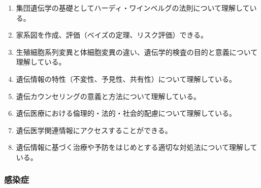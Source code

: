 \begin{enumerate}
\def\labelenumi{\arabic{enumi}.}
\tightlist
\item
  集団遺伝学の基礎としてハーディ・ワインベルグの法則について理解している。
\item
  家系図を作成、評価（ベイズの定理、リスク評価）できる。
\item
  生殖細胞系列変異と体細胞変異の違い、遺伝学的検査の目的と意義について理解している。
\item
  遺伝情報の特性（不変性、予見性、共有性）について理解している。
\item
  遺伝カウンセリングの意義と方法について理解している。
\item
  遺伝医療における倫理的・法的・社会的配慮について理解している。
\item
  遺伝医学関連情報にアクセスすることができる。
\item
  遺伝情報に基づく治療や予防をはじめとする適切な対処法について理解している。
\end{enumerate}

\hypertarget{ux611fux67d3ux75c7}{%
\subsubsection{感染症}\label{ux611fux67d3ux75c7}}

